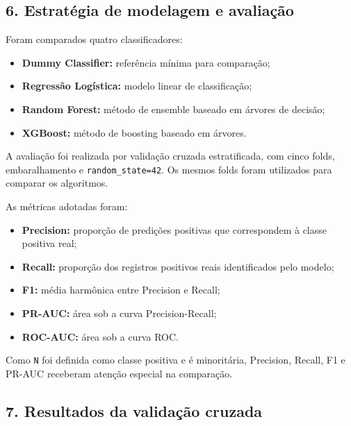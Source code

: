 \documentclass[
]{article}
\providecommand{\tightlist}{%
  \setlength{\itemsep}{0pt}\setlength{\parskip}{0pt}}
\begin{document}
\hypertarget{estratuxe9gia-de-modelagem-e-avaliauxe7uxe3o}{%
\subsection{6. Estratégia de modelagem e
avaliação}\label{estratuxe9gia-de-modelagem-e-avaliauxe7uxe3o}}

Foram comparados quatro classificadores:

\begin{itemize}
\tightlist
\item
  \textbf{Dummy Classifier:} referência mínima para comparação;
\item
  \textbf{Regressão Logística:} modelo linear de classificação;
\item
  \textbf{Random Forest:} método de ensemble baseado em árvores de
  decisão;
\item
  \textbf{XGBoost:} método de boosting baseado em árvores.
\end{itemize}

A avaliação foi realizada por validação cruzada estratificada, com cinco
folds, embaralhamento e \texttt{random\_state=42}. Os mesmos folds foram
utilizados para comparar os algoritmos.

As métricas adotadas foram:

\begin{itemize}
\tightlist
\item
  \textbf{Precision:} proporção de predições positivas que correspondem
  à classe positiva real;
\item
  \textbf{Recall:} proporção dos registros positivos reais identificados
  pelo modelo;
\item
  \textbf{F1:} média harmônica entre Precision e Recall;
\item
  \textbf{PR-AUC:} área sob a curva Precision-Recall;
\item
  \textbf{ROC-AUC:} área sob a curva ROC.
\end{itemize}

Como \texttt{N} foi definida como classe positiva e é minoritária,
Precision, Recall, F1 e PR-AUC receberam atenção especial na comparação.

\hypertarget{resultados-da-validauxe7uxe3o-cruzada}{%
\subsection{7. Resultados da validação
cruzada}\label{resultados-da-validauxe7uxe3o-cruzada}}
\end{document}
